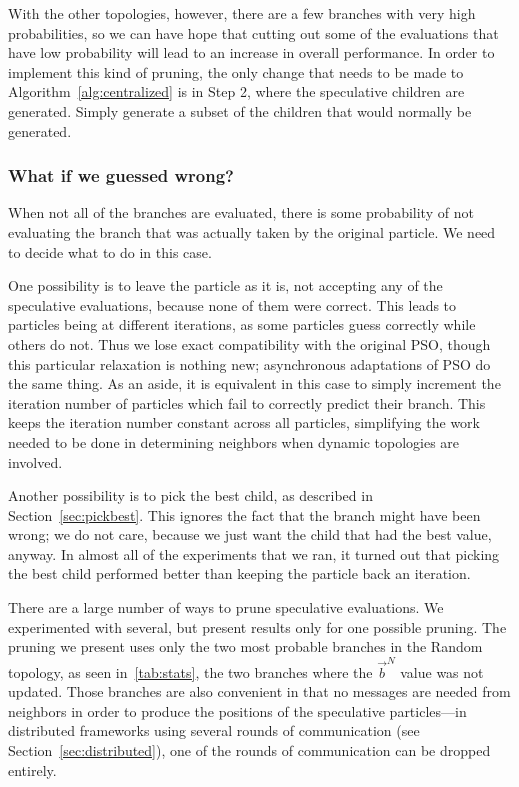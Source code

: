 \documentclass[journal,letterpaper]{IEEEtran}
\renewcommand{\sec}[1]{Section~\ref{sec:#1}}
\newcommand{\alg}[1]{Algorithm~\ref{alg:#1}}
\providecommand{\neigh}{\ensuremath{N}}
\providecommand{\nbest}{\ensuremath{\Vec{b}^\neigh}}
\begin{document}
With the other topologies, however, there are a few branches with very high
probabilities, so we can have hope that cutting out some of the evaluations
that have low probability will lead to an increase in overall performance.  In
order to implement this kind of pruning, the only change that needs to be made
to \alg{centralized} is in Step 2, where the speculative children are
generated.  Simply generate a subset of the children that would normally be
generated.

\subsubsection{What if we guessed wrong?}

When not all of the branches are evaluated, there is some probability of not
evaluating the branch that was actually taken by the original particle.  We 
need to decide what to do in this case.  

One possibility is to leave the particle as it is, not accepting any of the
speculative evaluations, because none of them were correct.  This leads to
particles being at different iterations, as some particles guess correctly
while others do not.  Thus we lose exact compatibility with the original PSO,
though this particular relaxation is nothing new; asynchronous adaptations of
PSO do the same thing.  As an aside, it is equivalent in this case to simply
increment the iteration number of particles which fail to correctly predict
their branch.  This keeps the iteration number constant across all particles,
simplifying the work needed to be done in determining neighbors when dynamic
topologies are involved.

Another possibility is to pick the best child, as described in \sec{pickbest}.
This ignores the fact that the branch might have been wrong; we do not care,
because we just want the child that had the best value, anyway.  In almost all
of the experiments that we ran, it turned out that picking the best child
performed better than keeping the particle back an iteration.

There are a large number of ways to prune speculative evaluations.  We
experimented with several, but present results only for one possible pruning.
The pruning we present uses only the two most probable branches in the Random
topology, as seen in~\ref{tab:stats}, the two branches where the $\nbest$ value
was not updated.  Those branches are also convenient in that no messages are
needed from neighbors in order to produce the positions of the speculative
particles---in distributed frameworks using several rounds of communication
(see \sec{distributed}), one of the rounds of communication can be dropped
entirely.
\end{document}
